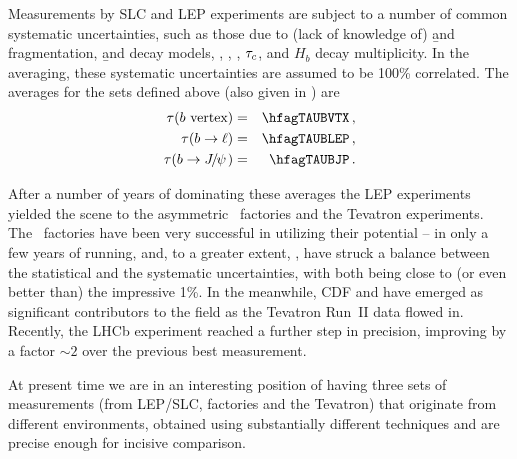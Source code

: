 Measurements by SLC and LEP experiments are subject to a number of
common systematic uncertainties, such as those due to (lack of knowledge
of) \b and  fragmentation, \b and  decay models,
, , , $\tau_{c}$,
and $H_b$ decay multiplicity.  In the averaging, these systematic
uncertainties are assumed to be 100\% correlated.  The averages for the
sets defined above (also given in ) are
\begin{eqnarray}
\tau(\b~\mbox{vertex}) &=& \hfagTAUBVTX \,, \labe{TAUBVTX} \\
\tau(\b\to\ell) &=& \hfagTAUBLEP  \,, \\
\tau(\b\to\particle{\jpsi}) &=& \hfagTAUBJP\,.
\end{eqnarray}



After a number of years of dominating these averages the LEP experiments
yielded the scene to the asymmetric \B~factories and
the Tevatron experiments. The \B~factories have been very successful in
utilizing their potential -- in only a few years of running, \babar and,
to a greater extent, \belle, have struck a balance between the
statistical and the systematic uncertainties, with both being close to
(or even better than) the impressive 1\%.  In the meanwhile, CDF and
\dzero have emerged as significant contributors to the field as the
Tevatron Run~II data flowed in. Recently, the LHCb experiment reached 
a further step in precision, improving by a factor $\sim 2 $ 
over the previous best measurement. 



At present time we are in an interesting position of having three sets
of measurements (from LEP/SLC, \B factories and the Tevatron) that
originate from different environments, obtained using substantially
different techniques and are precise enough for incisive comparison.

